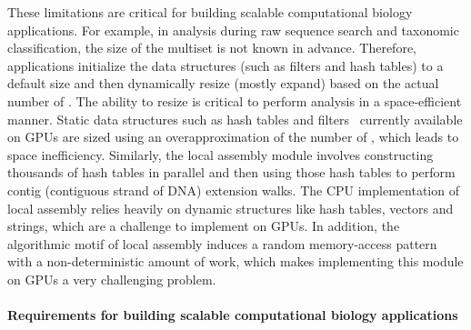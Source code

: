 These limitations are critical for building scalable computational biology applications. For example, in \kmer analysis during raw sequence search and taxonomic classification, the size of the \kmer multiset is not known in advance. Therefore, applications initialize the data structures (such as filters and hash tables) to a default size and then dynamically resize (mostly expand) based on the actual number of \kmers. The ability to resize is critical to perform \kmer analysis in a space-efficient manner. Static data structures such as hash tables and filters~\cite{Geil:2018:QFA} currently available on GPUs are sized using an overapproximation of the number of \kmers, which leads to space inefficiency.
Similarly, the local assembly module involves constructing thousands of hash tables in parallel and then using those hash tables to perform contig (contiguous strand of DNA) extension walks. The CPU implementation of local assembly relies heavily on dynamic
structures like hash tables, vectors and strings, which are a challenge to implement on GPUs. In addition, the algorithmic motif of local assembly induces a random memory-access pattern with a non-deterministic amount of work, which makes implementing this module on GPUs a very challenging problem.






\paragraph{Requirements for building scalable computational biology applications}

